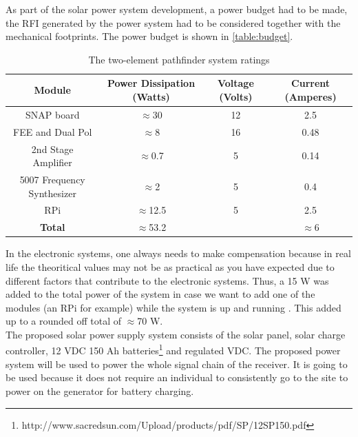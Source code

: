 \documentclass[12pt,a4paper]{report}
\begin{document}
	As part of the solar power system development, a power budget had to be made, the RFI generated by the power system had to be considered together with the mechanical footprints. The power budget is shown in \autoref{table:budget}. 
	
	\begin{table}[h!]
		\centering
		\begin{tabular}{|c | c | c | c |} 
			\hline
			Module & Power Dissipation (Watts) &  Voltage (Volts) & Current (Amperes)\\ [0.5ex] 
			\hline
			SNAP board & $\approx$30 & 12 & 2.5\\
			\hline
			FEE and Dual Pol & $\approx$8 & 16 & 0.48 \\
			\hline
			2nd Stage Amplifier & $\approx$0.7 & 5 & 0.14\\
			\hline
			5007 Frequency Synthesizer & $\approx$2 & 5 & 0.4\\
			\hline
			RPi & $\approx$12.5 & 5 & 2.5 \\
			\hline
			\textbf{Total} & $\approx$53.2 &  & $\approx$6 \\
			\hline
		\end{tabular}
		\caption{The two-element pathfinder system ratings}
		\label{table:budget}
	\end{table}
	
	In the electronic systems, one always needs to make compensation because in real life the theoritical values may not be as practical as you have expected due to different factors that contribute to the electronic systems. Thus, a 15 W was added to the total power of the system in case we want to add one of the modules (an RPi for example) while the system is up and running . This added up to a rounded off total of $\approx$70 W.\\
		
	The proposed solar power supply system consists of the solar panel, solar charge controller, 12 VDC 150 Ah batteries\footnote{http://www.sacredsun.com/Upload/products/pdf/SP/12SP150.pdf} and regulated VDC. The proposed power system will be used to power the whole signal chain of the receiver. It is going to be used because it does not require an individual to consistently go to the site to power on the generator for battery charging.\\
	
\end{document}
